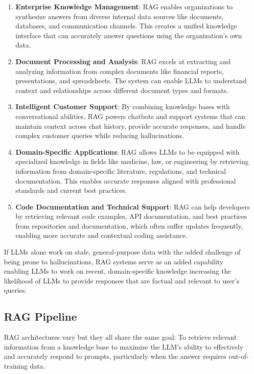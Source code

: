 \begin{enumerate}
    \item \textbf{Enterprise Knowledge Management}: RAG enables organizations to synthesize answers from diverse internal data sources like documents, databases, and communication channels. This creates a unified knowledge interface that can accurately answer questions using the organization's own data.
    \item \textbf{Document Processing and Analysis}: RAG excels at extracting and analyzing information from complex documents like financial reports, presentations, and spreadsheets. The system can enable LLMs to understand context and relationships across different document types and formats.
    \item \textbf{Intelligent Customer Support}: By combining knowledge bases with conversational abilities, RAG powers chatbots and support systems that can maintain context across chat history, provide accurate responses, and handle complex customer queries while reducing hallucinations.
    \item \textbf{Domain-Specific Applications}: RAG allows LLMs to be equipped with specialized knowledge in fields like medicine, law, or engineering by retrieving information from domain-specific literature, regulations, and technical documentation. This enables accurate responses aligned with professional standards and current best practices.
    \item \textbf{Code Documentation and Technical Support}: RAG can help developers by retrieving relevant code examples, API documentation, and best practices from repositories and documentation, which often suffer updates frequently, enabling more accurate and contextual coding assistance.
\end{enumerate}

If LLMs alone work on stale, general-purpose data with the added challenge of being prone to hallucinations, RAG systems serve as an added capability enabling LLMs to work on recent, domain-specific knowledge increasing the likelihood of LLMs to provide responses that are factual and relevant to user's queries.
\subsection{RAG Pipeline}

RAG architectures vary but they all share the same goal: To retrieve relevant information from a knowledge base to maximize the LLM's ability to effectively and accurately respond to prompts, particularly when the answer requires out-of-training data.

